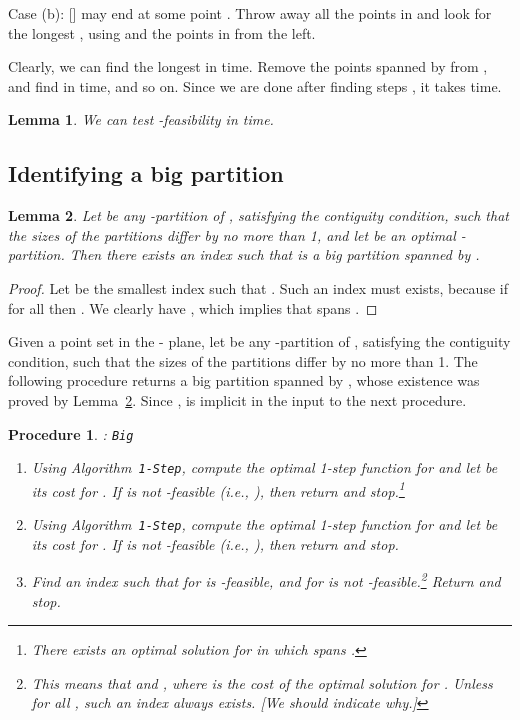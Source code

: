 \documentclass[preprint,10pt]{elsarticle}
\newcommand{\QED}{\hfill}
\newtheorem{lemma}{Lemma}
\newtheorem{procedure}{Procedure}
\begin{document}
Case (b): []  may end at some point .
Throw away all the points in 
and look for the longest , using  and the points in  from the left.


Clearly,
we can find the longest  in  time.
Remove the points spanned by  from ,
and find  in  time, and so on.
Since we are done after finding  steps ,
it takes  time.

\begin{lemma}\label{lem:feasibility}
We can test -feasibility in  time.
\QED
\end{lemma}

\subsection{Identifying a big partition}\label{sec:findBig}
\begin{lemma}\label{lem:big}
Let  be any -partition of ,
satisfying the contiguity condition,
such that the sizes of the partitions differ by no more than 1,
and let  be an optimal -partition.
Then there exists an index  such that  is a big partition spanned by .
\end{lemma}
\begin{proof} 
Let  be the smallest index such that .
Such an index must exists, because if 
for all  then .
We clearly have ,
which implies that  spans .
\end{proof}

Given a point set  in the - plane,
let  be any -partition of ,
satisfying the contiguity condition,
such that the sizes of the partitions differ by no more than 1.
The following procedure returns a big partition  spanned by ,
whose existence was proved by Lemma~\ref{lem:big}.
Since ,
 is implicit in the input to the next procedure.

\begin{procedure}{\rm :} {\tt Big}\label{proc:bigk}

\noindent
\begin{enumerate}
\item
Using Algorithm~{\tt 1-Step}, compute the optimal 1-step function for 
and let  be its cost for .
If  is not -feasible (i.e., ),
then return  and stop.\footnote{There exists an optimal solution for 
 in which  spans .}
\item
Using Algorithm~{\tt 1-Step}, compute the optimal 1-step function for 
and let  be its cost for .
If  is not -feasible (i.e., ),
then return  and stop.
\item
Find an index  such that for 
 is -feasible, 
and for   is not -feasible.\footnote{This means
that  and ,
where  is the cost of the optimal solution for .
Unless  for all , such an index  always exists.
[We should indicate why.]}
Return  and stop.
\end{enumerate}
\end{procedure}
\end{document}
